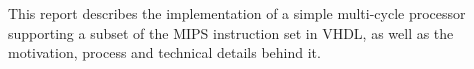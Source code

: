 
This report describes the implementation of a simple multi-cycle processor 
supporting a subset of the MIPS instruction set  in VHDL, 
as well as the motivation, process and technical details behind it.

